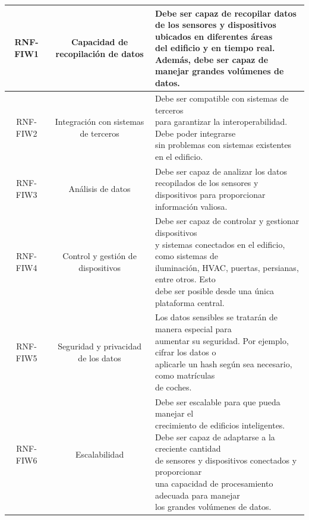 \documentclass[12pt, a4paper, twoside]{article}
\begin{document}
{\begin{longtable}{ |c|c|l| }
  RNF-FIW1 & Capacidad de recopilación de datos 
  & \makecell[l]{Debe ser capaz de recopilar datos \\
  de los sensores y dispositivos ubicados en diferentes áreas \\
  del edificio y en tiempo real. Además, debe ser capaz de\\
  manejar grandes volúmenes de datos.
  } \\ \hline
  RNF-FIW2 & Integración con sistemas de terceros 
  & \makecell[l]{Debe ser compatible con sistemas de terceros\\
  para garantizar la interoperabilidad. Debe poder integrarse\\
  sin problemas con sistemas existentes en el edificio.
  } \\ \hline
  RNF-FIW3 & Análisis de datos
  & \makecell[l]{Debe ser capaz de analizar los datos\\
  recopilados de los sensores y dispositivos para proporcionar\\
  información valiosa.
  } \\ \hline

  RNF-FIW4 & Control y gestión de dispositivos
  & \makecell[l]{
    Debe ser capaz de controlar y gestionar dispositivos\\
    y sistemas conectados en el edificio, como sistemas de\\
    iluminación, HVAC, puertas, persianas, entre otros. Esto\\
    debe ser posible desde una única plataforma central.
  } \\ \hline

  RNF-FIW5 & Seguridad y privacidad de los datos
  & \makecell[l]{
    Los datos sensibles se tratarán de manera especial para\\
    aumentar su seguridad. Por ejemplo, cifrar los datos o\\
    aplicarle un hash según sea necesario, como matrículas\\
    de coches.
  } \\ \hline

  RNF-FIW6 & Escalabilidad
  & \makecell[l]{
    Debe ser escalable para que pueda manejar el\\
    crecimiento de edificios inteligentes.\\
    Debe ser capaz de adaptarse a la creciente cantidad\\
    de sensores y dispositivos conectados y proporcionar\\
    una capacidad de procesamiento adecuada para manejar\\
    los grandes volúmenes de datos.
  } \\ \hline


\end{longtable}}
\end{document}
